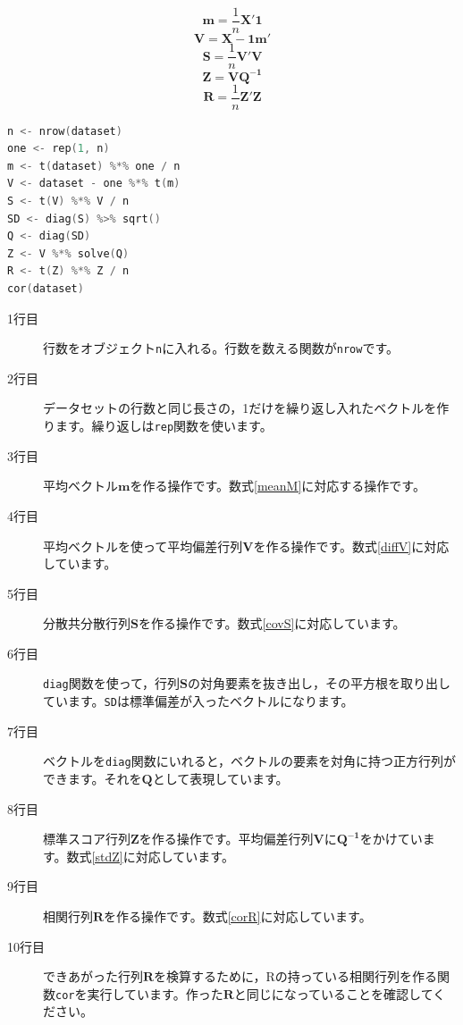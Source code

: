 \documentclass{ltjsbook}
\begin{document}
\begin{equation}
	\label{meanM} \bm{m} = \frac{1}{n}\bm{X'1}
\end{equation}
\begin{equation}
	\label{diffV} \bm{V} = \bm{X}-\bm{1m'}
\end{equation}
\begin{equation}
	\label{covS} \bm{S} = \frac{1}{n}\bm{V'V}
\end{equation}
\begin{equation}
	\label{stdZ} \bm{Z} = \bm{VQ^{-1}}
\end{equation}
\begin{equation}
	\label{corR} \bm{R} = \frac{1}{n}\bm{Z'Z}
\end{equation}

\begin{lstlisting}[language=c++,label={code:09_08},caption={データの行列演算}]
n <- nrow(dataset)
one <- rep(1, n)
m <- t(dataset) %*% one / n
V <- dataset - one %*% t(m)
S <- t(V) %*% V / n
SD <- diag(S) %>% sqrt()
Q <- diag(SD)
Z <- V %*% solve(Q)
R <- t(Z) %*% Z / n
cor(dataset)
\end{lstlisting}
\begin{description}
	\item[1行目] 行数をオブジェクト\texttt{n}に入れる。行数を数える関数が\texttt{nrow}です。
	\item[2行目] データセットの行数と同じ長さの，1だけを繰り返し入れたベクトルを作ります。繰り返しは\texttt{rep}関数を使います。
	\item[3行目] 平均ベクトル$\bm{m}$を作る操作です。数式\ref{meanM}に対応する操作です。
	\item[4行目] 平均ベクトルを使って平均偏差行列$\bm{V}$を作る操作です。数式\ref{diffV}に対応しています。
	\item[5行目] 分散共分散行列$\bm{S}$を作る操作です。数式\ref{covS}に対応しています。
	\item[6行目] \texttt{diag}関数を使って，行列$\bm{S}$の対角要素を抜き出し，その平方根を取り出しています。\texttt{SD}は標準偏差が入ったベクトルになります。
	\item[7行目] ベクトルを\texttt{diag}関数にいれると，ベクトルの要素を対角に持つ正方行列ができます。それを$\bm{Q}$として表現しています。
	\item[8行目] 標準スコア行列$\bm{Z}$を作る操作です。平均偏差行列$\bm{V}$に$\bm{Q^{-1}}$をかけています。数式\ref{stdZ}に対応しています。
	\item[9行目] 相関行列$\bm{R}$を作る操作です。数式\ref{corR}に対応しています。
	\item[10行目] できあがった行列$\bm{R}$を検算するために，Rの持っている相関行列を作る関数\texttt{cor}を実行しています。作った$\bm{R}$と同じになっていることを確認してください。
\end{description}
\end{document}

